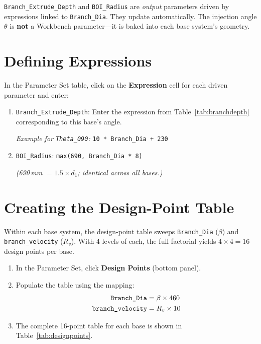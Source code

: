 \documentclass[12pt,a4paper]{report}
\begin{document}
\noindent \texttt{Branch\_Extrude\_Depth} and \texttt{BOI\_Radius} are
\emph{output} parameters driven by expressions linked to
\texttt{Branch\_Dia}.  They update automatically.  The injection angle
$\theta$ is \textbf{not} a Workbench parameter---it is baked into each
base system's geometry.


\section{Defining Expressions}

In the Parameter Set table, click on the \textbf{Expression} cell for
each driven parameter and enter:

\begin{enumerate}
  \item \texttt{Branch\_Extrude\_Depth}: Enter the expression from
        Table~\ref{tab:branchdepth} corresponding to this base's angle.

        \emph{Example for \texttt{Theta\_090}:}
        \texttt{10 * Branch\_Dia + 230}

  \item \texttt{BOI\_Radius}: \quad
        \texttt{max(690, Branch\_Dia * 8)}

        \emph{(690\,mm $= 1.5 \times d_1$; identical across all bases.)}
\end{enumerate}


\section{Creating the Design-Point Table}

Within each base system, the design-point table sweeps \texttt{Branch\_Dia}
($\beta$) and \texttt{branch\_velocity} ($R_v$).  With 4 levels of each,
the full factorial yields $4 \times 4 = 16$ design points per base.

\begin{enumerate}
  \item In the Parameter Set, click \textbf{Design Points} (bottom panel).
  \item Populate the table using the mapping:
  \begin{align}
    \texttt{Branch\_Dia} &= \beta \times 460 \notag \\
    \texttt{branch\_velocity} &= R_v \times 10 \notag
  \end{align}
  \item The complete 16-point table for each base is shown in
        Table~\ref{tab:designpoints}.
\end{enumerate}
\end{document}

